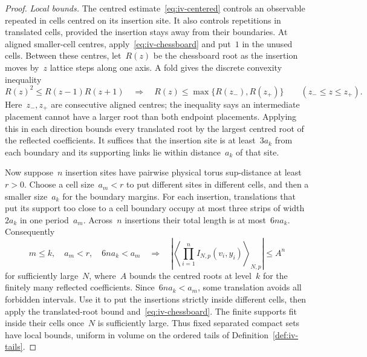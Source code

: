 \begin{proof}
\emph{Local bounds.}
The centred estimate~\eqref{eq:iv-centered} controls an observable repeated in cells centred on its insertion site.
It also controls repetitions in translated cells, provided the insertion stays away from their boundaries.
At aligned smaller-cell centres, apply~\eqref{eq:iv-chessboard} and put~$1$ in the unused cells.
Between these centres, let~$R(z)$ be the chessboard root as the insertion moves by~$z$ lattice steps along one axis.
A fold gives the discrete convexity inequality
\begin{equation*}
 R(z)^2\le R(z-1)R(z+1)
 \quad\Longrightarrow\quad
 R(z)\le\max\{R(z_-),R(z_+)\}\qquad(z_-\le z\le z_+).
\end{equation*}
Here~$z_-,z_+$ are consecutive aligned centres; the inequality says an intermediate placement cannot have a larger root than both endpoint placements.
Applying this in each direction bounds every translated root by the largest centred root of the reflected coefficients.
It suffices that the insertion site is at least~$3a_k$ from each boundary and its supporting links lie within distance~$a_k$ of that site.

Now suppose~$n$ insertion sites have pairwise physical torus sup-distance at least~$r>0$.
Choose a cell size~$a_m<r$ to put different sites in different cells, and then a smaller size~$a_k$ for the boundary margins.
For each insertion, translations that put its support too close to a cell boundary occupy at most three strips of width~$2a_k$ in one period~$a_m$. Across~$n$ insertions their total length is at most~$6na_k$.
Consequently
\begin{equation}\label{eq:iv-separated-bound}
 m\le k,\quad a_m<r,\quad6na_k<a_m
 \quad\Longrightarrow\quad
 \left|\left\langle\prod_{i=1}^n I_{N,p}(v_i,y_i)\right\rangle_{N,p}\right|\le A^n
\end{equation}
for sufficiently large~$N$, where~$A$ bounds the centred roots at level~$k$ for the finitely many reflected coefficients.
Since~$6na_k<a_m$, some translation avoids all forbidden intervals. Use it to put the insertions strictly inside different cells, then apply the translated-root bound and~\eqref{eq:iv-chessboard}.
The finite supports fit inside their cells once~$N$ is sufficiently large.
Thus fixed separated compact sets have local bounds, uniform in volume on the ordered tails of Definition~\ref{def:iv-tails}.


\end{proof}
